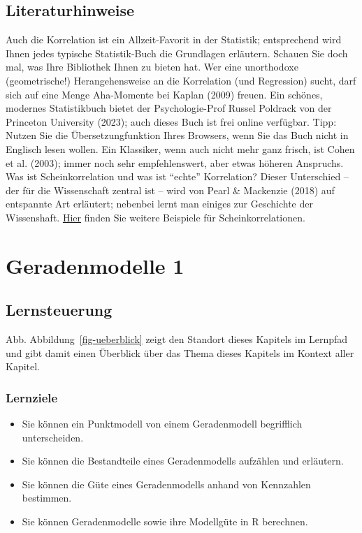 \documentclass[
  letterpaper,
]{scrbook}
\providecommand{\tightlist}{%
  \setlength{\itemsep}{0pt}\setlength{\parskip}{0pt}}\usepackage{longtable,booktabs,array}
\theoremstyle{definition}
\theoremstyle{definition}
\theoremstyle{definition}
\theoremstyle{remark}
\begin{document}
\section{Literaturhinweise}\label{literaturhinweise-6}

Auch die Korrelation ist ein Allzeit-Favorit in der Statistik;
entsprechend wird Ihnen jedes typische Statistik-Buch die Grundlagen
erläutern. Schauen Sie doch mal, was Ihre Bibliothek Ihnen zu bieten
hat. Wer eine unorthodoxe (geometrische!) Herangehensweise an die
Korrelation (und Regression) sucht, darf sich auf eine Menge Aha-Momente
bei Kaplan (2009) freuen. Ein schönes, modernes Statistikbuch bietet der
Psychologie-Prof Russel Poldrack von der Princeton University (2023);
auch dieses Buch ist frei online verfügbar. Tipp: Nutzen Sie die
Übersetzungfunktion Ihres Browsers, wenn Sie das Buch nicht in Englisch
lesen wollen. Ein Klassiker, wenn auch nicht mehr ganz frisch, ist Cohen
et al. (2003); immer noch sehr empfehlenswert, aber etwas höheren
Anspruchs. Was ist Scheinkorrelation und was ist ``echte'' Korrelation?
Dieser Unterschied -- der für die Wissenschaft zentral ist -- wird von
Pearl \& Mackenzie (2018) auf entspannte Art erläutert; nebenbei lernt
man einiges zur Geschichte der Wissenshaft.
\href{https://scheinkorrelation.jimdofree.com/}{Hier} finden Sie weitere
Beispiele für Scheinkorrelationen.

\chapter{Geradenmodelle 1}\label{sec-gerade1}

\section{Lernsteuerung}\label{lernsteuerung-7}

Abb. Abbildung~\ref{fig-ueberblick} zeigt den Standort dieses Kapitels
im Lernpfad und gibt damit einen Überblick über das Thema dieses
Kapitels im Kontext aller Kapitel.

\subsection{Lernziele}\label{lernziele-8}

\begin{itemize}
\tightlist
\item
  Sie können ein Punktmodell von einem Geradenmodell begrifflich
  unterscheiden.
\item
  Sie können die Bestandteile eines Geradenmodells aufzählen und
  erläutern.
\item
  Sie können die Güte eines Geradenmodells anhand von Kennzahlen
  bestimmen.
\item
  Sie können Geradenmodelle sowie ihre Modellgüte in R berechnen.
\end{itemize}
\end{document}
